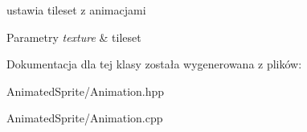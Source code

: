 ustawia tileset z animacjami 


\begin{DoxyParams}{Parametry}
{\em texture} & tileset \\
\hline
\end{DoxyParams}


Dokumentacja dla tej klasy została wygenerowana z plików\-:\begin{DoxyCompactItemize}
\item 
Animated\-Sprite/Animation.\-hpp\item 
Animated\-Sprite/Animation.\-cpp\end{DoxyCompactItemize}
